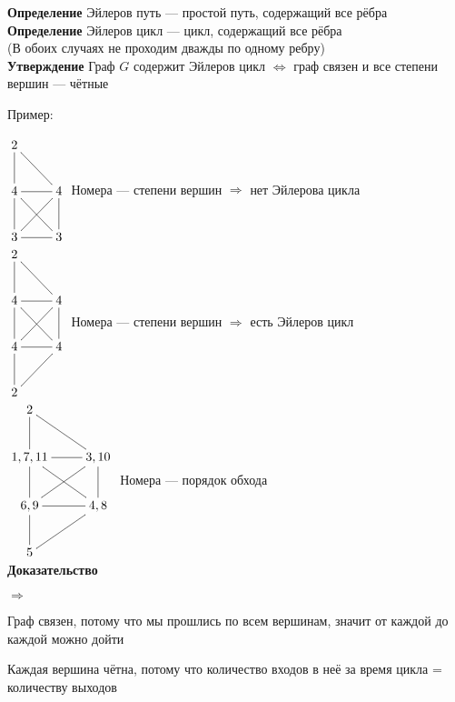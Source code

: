 \documentclass[a4paper, 12pt] {article}
\begin{document}
\textbf{Определение} Эйлеров путь --- простой путь, содержащий все рёбра\\

\textbf{Определение} Эйлеров цикл --- цикл, содержащий все рёбра\\

(В обоих случаях не проходим дважды по одному ребру)\\

\textbf{Утверждение} Граф $ G $ содержит Эйлеров цикл $ \Leftrightarrow $ граф связен и все степени вершин --- чётные

Пример:

$ \begin{matrix}
	\xymatrix{
		2 \ar@{-}[rd]  \ar@{-}[d]  \\
		4 \ar@{-}[d] \ar@{-}[r] \ar@{-}[rd]& 4 \ar@{-}[ld] \ar@{-}[d]  \\
		 3 \ar@{-}[r] & 3 \\
	}
\end{matrix} $ Номера --- степени вершин $ \Rightarrow $ нет Эйлерова цикла\\

$ \begin{matrix}
	\xymatrix{
		2 \ar@{-}[rd]  \ar@{-}[d]  \\
		4 \ar@{-}[d] \ar@{-}[r] \ar@{-}[rd]& 4 \ar@{-}[ld] \ar@{-}[d]  \\
		4 \ar@{-}[r] & 4 \\
		2 \ar@{-}[ru]  \ar@{-}[u]  \\
	}
\end{matrix} $ Номера --- степени вершин $ \Rightarrow $ есть Эйлеров цикл\\

$ \begin{matrix}
	\xymatrix{
		2 \ar@{-}[rd]  \ar@{-}[d]  \\
		1, 7, 11 \ar@{-}[d] \ar@{-}[r] \ar@{-}[rd]& 3, 10 \ar@{-}[ld] \ar@{-}[d]  \\
		6, 9 \ar@{-}[r] & 4, 8 \\
		5 \ar@{-}[ru]  \ar@{-}[u]  \\
	}
\end{matrix} $ Номера --- порядок обхода\\

\textbf{Доказательство}

$ \Rightarrow $ 

Граф связен, потому что мы прошлись по всем вершинам, значит от каждой до каждой можно дойти

Каждая вершина чётна, потому что количество входов в неё за время цикла = количеству выходов
\end{document}
